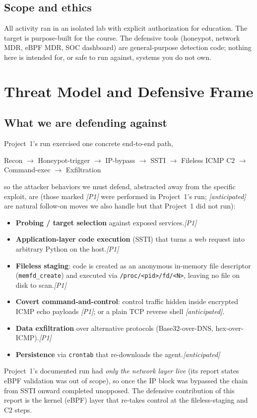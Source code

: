 \documentclass[11pt]{article}
\newcommand{\co}[1]{\texttt{#1}}
\begin{document}
\subsection{Scope and ethics}
All activity ran in an isolated lab with explicit authorization for
education. The target is purpose-built for the course. The defensive tools
(honeypot, network MDR, eBPF MDR, SOC dashboard) are general-purpose
detection code; nothing here is intended for, or safe to run against,
systems you do not own.

\section{Threat Model and Defensive Frame}

\subsection{What we are defending against}
Project~1's run exercised one concrete end-to-end path,
\begin{center}
\small\ttfamily Recon $\rightarrow$ Honeypot-trigger $\rightarrow$ IP-bypass
$\rightarrow$ SSTI $\rightarrow$ Fileless ICMP C2 $\rightarrow$ Command-exec
$\rightarrow$ Exfiltration
\end{center}
so the attacker behaviors we must defend, abstracted away from the specific
exploit, are (those marked \emph{[P1]} were performed in Project~1's run;
\emph{[anticipated]} are natural follow-on moves we also handle but that
Project~1 did not run):
\begin{itemize}[leftmargin=1.4em]
  \item \textbf{Probing / target selection} against exposed services.\hfill\emph{[P1]}
  \item \textbf{Application-layer code execution} (SSTI) that turns a web
        request into arbitrary Python on the host.\hfill\emph{[P1]}
  \item \textbf{Fileless staging}: code is created as an anonymous in-memory
        file descriptor (\co{memfd\_create}) and executed via
        \co{/proc/<pid>/fd/<N>}, leaving no file on disk to scan.\hfill\emph{[P1]}
  \item \textbf{Covert command-and-control}: control traffic hidden inside
        encrypted ICMP echo payloads \emph{[P1]}; or a plain TCP reverse
        shell \emph{[anticipated]}.
  \item \textbf{Data exfiltration} over alternative protocols (Base32-over-DNS,
        hex-over-ICMP).\hfill\emph{[P1]}
  \item \textbf{Persistence} via \co{crontab} that re-downloads the agent.\hfill\emph{[anticipated]}
\end{itemize}
Project~1's documented run had \emph{only the network layer live} (its report
states eBPF validation was out of scope), so once the IP block was bypassed
the chain from SSTI onward completed unopposed. The defensive contribution of
this report is the kernel (eBPF) layer that re-takes control at the
fileless-staging and C2 steps.
\end{document}
